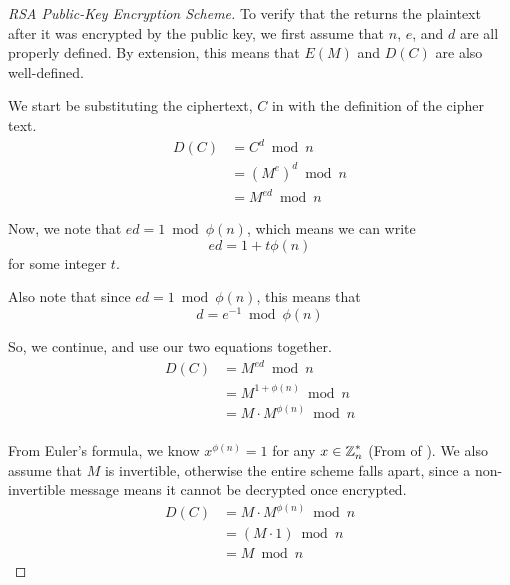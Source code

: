 \begin{proof}[RSA Public-Key Encryption Scheme]\label{proof:RSA_Public_Key_Encryption_Scheme}
  To verify that the  returns the plaintext after it was encrypted by the public key, we first assume that $n$, $e$, and $d$ are all properly defined.
  By extension, this means that $E(M)$ and $D(C)$ are also well-defined.

  We start be substituting the ciphertext, $C$ in  with the definition of the cipher text.
  \begin{equation*}
    \begin{aligned}
      D(C) &= C^{d} \bmod n \\
      &= {(M^{e})}^{d} \bmod n \\
      &= M^{ed} \bmod n
    \end{aligned}
  \end{equation*}

  Now, we note that $ed = 1 \bmod \phi(n)$, which means we can write
  \begin{equation*}
    ed = 1 + t \phi(n)
  \end{equation*}
  for some integer $t$.

  Also note that since $ed = 1 \bmod \phi(n)$, this means that
  \begin{equation*}
    d = e^{-1} \bmod \phi(n)
  \end{equation*}

  So, we continue, and use our two equations together.
  \begin{equation*}
    \begin{aligned}
      D(C) &= M^{ed} \bmod n \\
      &= M^{1 + \phi(n)} \bmod n \\
      &= M \cdot M^{\phi(n)} \bmod n \\
    \end{aligned}
  \end{equation*}

  From Euler's formula, we know $x^{\phi(n)} = 1$ for any $x \in \operatorname{\mathbb{Z}}_{n}^{*}$ (From  of ).
  We also assume that $M$ is invertible, otherwise the entire scheme falls apart, since a non-invertible message means it cannot be decrypted once encrypted.
  \begin{equation*}
    \begin{aligned}
      D(C) &= M \cdot M^{\phi(n)} \bmod n \\
      &= (M \cdot 1) \bmod n \\
      &= M \bmod n
    \end{aligned}
  \end{equation*}
\end{proof}

